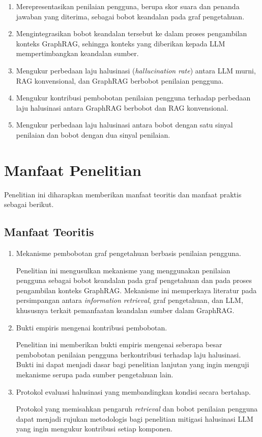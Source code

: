 \begin{enumerate}
    \item Merepresentasikan penilaian pengguna, berupa skor suara dan penanda jawaban yang diterima, sebagai bobot keandalan pada graf pengetahuan.
    \item Mengintegrasikan bobot keandalan tersebut ke dalam proses pengambilan konteks GraphRAG, sehingga konteks yang diberikan kepada LLM mempertimbangkan keandalan sumber.
    \item Mengukur perbedaan laju halusinasi (\emph{hallucination rate}) antara LLM murni, RAG konvensional, dan GraphRAG berbobot penilaian pengguna.
    \item Mengukur kontribusi pembobotan penilaian pengguna terhadap perbedaan laju halusinasi antara GraphRAG berbobot dan RAG konvensional.
    \item Mengukur perbedaan laju halusinasi antara bobot dengan satu sinyal penilaian dan bobot dengan dua sinyal penilaian.
\end{enumerate}

\section{Manfaat Penelitian}

Penelitian ini diharapkan memberikan manfaat teoritis dan manfaat praktis sebagai berikut.

\subsection*{Manfaat Teoritis}

\begin{enumerate}
    \item Mekanisme pembobotan graf pengetahuan berbasis penilaian pengguna.

    Penelitian ini mengusulkan mekanisme yang menggunakan penilaian pengguna sebagai bobot keandalan pada graf pengetahuan dan pada proses pengambilan konteks GraphRAG. Mekanisme ini memperkaya literatur pada persimpangan antara \emph{information retrieval}, graf pengetahuan, dan LLM, khususnya terkait pemanfaatan keandalan sumber dalam GraphRAG.

    \item Bukti empiris mengenai kontribusi pembobotan.

    Penelitian ini memberikan bukti empiris mengenai seberapa besar pembobotan penilaian pengguna berkontribusi terhadap laju halusinasi. Bukti ini dapat menjadi dasar bagi penelitian lanjutan yang ingin menguji mekanisme serupa pada sumber pengetahuan lain.

    \item Protokol evaluasi halusinasi yang membandingkan kondisi secara bertahap.

    Protokol yang memisahkan pengaruh \emph{retrieval} dan bobot penilaian pengguna dapat menjadi rujukan metodologis bagi penelitian mitigasi halusinasi LLM yang ingin mengukur kontribusi setiap komponen.
\end{enumerate}

